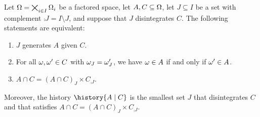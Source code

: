 \documentclass[USenglish,onecolumn]{article}
\begin{document}
\begin{lemma}
  \label{lemma:characterization_event_generation}
  Let $\Omega = \bigtimes_{i\in I}\Omega_i$ be a factored space, let $A, C \subseteq \Omega$, let $J \subseteq I$ be a set with complement $\comp{J} = I \setminus J$, and suppose that $J$ disintegrates $C$.
  The following statements are equivalent:
  \begin{enumerate}[label=(\roman*),leftmargin=*]
    \item\label{item:gen-1} $J$ generates $A$ given $C$.
    \item\label{item:gen-2} For all $\omega, \omega' \in C$ with $\omega_J = \omega_J'$, we have $\omega \in A$ if and only if $\omega' \in A$.
    \item\label{item:gen-3} $A \cap C = (A \cap C)_J \times C_{\comp{J}}$.
  \end{enumerate}
  Moreover, the history $\history{A \given C}$ is the smallest set $J$ that disintegrates $C$ and that satisfies $A \cap C = (A \cap C)_J \times C_{\comp{J}}$.
\end{lemma}
\end{document}

